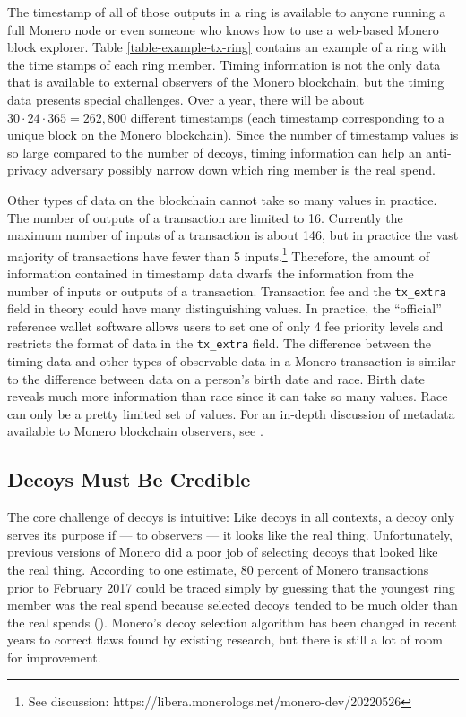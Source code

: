 \documentclass[english]{article}
\begin{document}
The timestamp of all of those outputs in a ring is available to anyone
running a full Monero node or even someone who knows how to use a
web-based Monero block explorer. Table \ref{table-example-tx-ring}
contains an example of a ring with the time stamps of each ring member.
Timing information is not the only data that is available to external
observers of the Monero blockchain, but the timing data presents special
challenges. Over a year, there will be about $30\cdot24\cdot365=262,800$
different timestamps (each timestamp corresponding to a unique block
on the Monero blockchain). Since the number of timestamp values is
so large compared to the number of decoys, timing information can
help an anti-privacy adversary possibly narrow down which ring member
is the real spend.

Other types of data on the blockchain cannot take so many values in
practice. The number of outputs of a transaction are limited to 16.
Currently the maximum number of inputs of a transaction is about 146,
but in practice the vast majority of transactions have fewer than
5 inputs.\footnote{See discussion: https://libera.monerologs.net/monero-dev/20220526}
Therefore, the amount of information contained in timestamp data dwarfs
the information from the number of inputs or outputs of a transaction.
Transaction fee and the \texttt{tx\_extra} field in theory could have
many distinguishing values. In practice, the ``official'' reference
wallet software allows users to set one of only 4 fee priority levels
and restricts the format of data in the \texttt{tx\_extra} field.
The difference between the timing data and other types of observable
data in a Monero transaction is similar to the difference between
data on a person's birth date and race. Birth date reveals much more
information than race since it can take so many values. Race can only
be a pretty limited set of values. For an in-depth discussion of metadata
available to Monero blockchain observers, see \cite{Krawiec-Thayer2021}.

\subsection{Decoys Must Be Credible}

The core challenge of decoys is intuitive: Like decoys in all contexts,
a decoy only serves its purpose if --- to observers --- it looks
like the real thing. Unfortunately, previous versions of Monero did
a poor job of selecting decoys that looked like the real thing. According
to one estimate, 80 percent of Monero transactions prior to February
2017 could be traced simply by guessing that the youngest ring member
was the real spend because selected decoys tended to be much older
than the real spends (\cite{2018}). Monero's decoy selection algorithm
has been changed in recent years to correct flaws found by existing
research, but there is still a lot of room for improvement.
\end{document}

